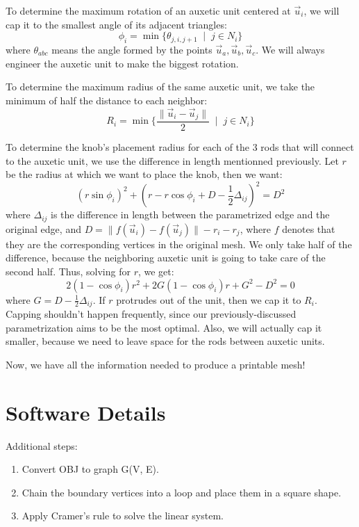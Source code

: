 \documentclass{article}
\begin{document}
To determine the maximum rotation of an auxetic unit centered at $\vec{u}_i$, we will cap it to the smallest angle of its adjacent triangles:
$$\phi_i = \min\{\theta_{j, i, j + 1} \; \mid \; j \in N_i\}$$
where $\theta_{abc}$ means the angle formed by the points $\vec{u}_a, \vec{u}_b, \vec{u}_c$. We will always engineer the auxetic unit to make the biggest rotation.

To determine the maximum radius of the same auxetic unit, we take the minimum of half the distance to each neighbor:
$$R_i = \min\{\frac{\lVert \vec{u}_i - \vec{u}_j \rVert}{2} \; \mid \; j \in N_i\}$$

To determine the knob's placement radius for each of the 3 rods that will connect to the auxetic unit, we use the difference in length mentionned previously. Let $r$ be the radius at which we want to place the knob, then we want:
$$(r \sin \phi_i)^2 + (r - r \cos \phi_i + D - \frac{1}{2}\Delta_{ij})^2 = D^2$$
where $\Delta_{ij}$ is the difference in length between the parametrized edge and the original edge, and $D = \lVert f(\vec{u}_i) - f(\vec{u}_j) \rVert - r_i - r_j$, where $f$ denotes that they are the corresponding vertices in the original mesh. We only take half of the difference, because the neighboring auxetic unit is going to take care of the second half. Thus, solving for $r$, we get:
$$2(1 - \cos \phi_i)r^2 + 2 G (1 - \cos \phi_i) r + G^2 - D^2 = 0$$
where $G = D - \frac{1}{2}\Delta_{ij}$. If $r$ protrudes out of the unit, then we cap it to $R_i$. Capping shouldn't happen frequently, since our previously-discussed parametrization aims to be the most optimal. Also, we will actually cap it smaller, because we need to leave space for the rods between auxetic units.

Now, we have all the information needed to produce a printable mesh!

\section{Software Details}

Additional steps:
\begin{enumerate}
  \item Convert OBJ to graph G(V, E).
  \item Chain the boundary vertices into a loop and place them in a square shape.
  \item Apply Cramer's rule to solve the linear system.
\end{enumerate}

\pagebreak

\printbibliography
\end{document}
